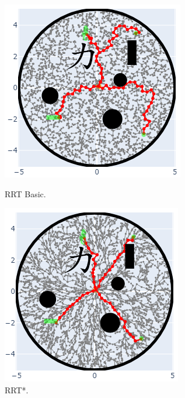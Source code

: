 		\begin{figure}[H]
	\centering
	\begin{minipage}[b]{0.4\textwidth}
		\includegraphics[width=\textwidth]{links/circle_basic.png}
		\caption{RRT Basic.}
	\end{minipage}
	\hfill
	\begin{minipage}[b]{0.4\textwidth}
		\includegraphics[width=\textwidth]{links/circle_star.png}
		\caption{RRT*.}
	\end{minipage}
\end{figure}

